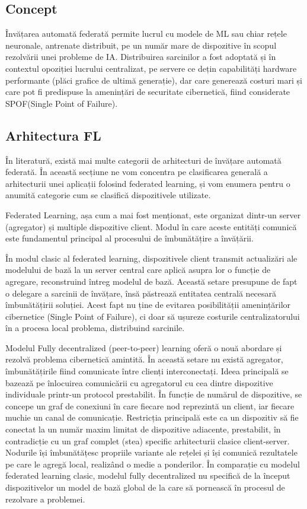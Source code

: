 \documentclass[../../main.tex]{subfiles}
\begin{document}
    \subsection{Concept}

    Învățarea automată federată permite lucrul cu modele de ML sau chiar rețele neuronale, antrenate distribuit, pe un număr mare de dispozitive în scopul rezolvării unei probleme de IA. Distribuirea sarcinilor a fost adoptată și în contextul opoziției lucrului centralizat, pe servere ce dețin capabilități hardware performante (plăci grafice de ultimă generație), dar care generează costuri mari și care pot fi predispuse la amenințări de securitate cibernetică, fiind considerate SPOF(Single Point of Failure).    

    \subsection{Arhitectura FL}


În literatură, există mai multe categorii de arhitecturi de învățare automată federată. În această secțiune ne vom concentra pe clasificarea generală a arhitecturii unei aplicații folosind federated learning, și vom enumera pentru o anumită categorie cum se clasifică dispozitivele utilizate.

Federated Learning, așa cum a mai fost menționat, este organizat dintr-un server (agregator) și multiple dispozitive client. Modul în care aceste entități comunică este fundamentul principal al procesului de îmbunătățire a învățării.

În modul clasic al federated learning, dispozitivele client transmit actualizări ale modelului de bază la un server central care aplică asupra lor o funcție de agregare, reconstruind întreg modelul de bază. Această setare presupune de fapt o delegare a sarcinii de învățare, însă păstrează entitatea centrală necesară îmbunătățirii soluției.
Acest fapt nu ține de evitarea posibilității amenințărilor cibernetice (Single Point of Failure), ci doar să ușureze costurile centralizatorului în a procesa local problema, distribuind sarcinile.

Modelul Fully decentralized (peer-to-peer) learning oferă o nouă abordare și rezolvă problema cibernetică amintită. În această setare nu există agregator, îmbunătățirile fiind comunicate între clienți interconectați. Ideea principală se bazează pe înlocuirea comunicării cu agregatorul cu cea dintre dispozitive individuale printr-un protocol prestabilit.
În funcție de numărul de dispozitive, se concepe un graf de conexiuni în care fiecare nod reprezintă un client, iar fiecare muchie un canal de comunicație. Restricția principală este ca un dispozitiv să fie conectat la un număr maxim limitat de dispozitive adiacente, prestabilit, în contradicție cu un graf complet (stea) specific arhitecturii clasice client-server.
Nodurile își îmbunătățesc propriile variante ale rețelei și își comunică rezultatele pe care le agregă local, realizând o medie a ponderilor.
În comparație cu modelul federated learning clasic, modelul fully decentralized nu specifică de la început dispozitivelor un model de bază global de la care să pornească în procesul de rezolvare a problemei.
\end{document}
